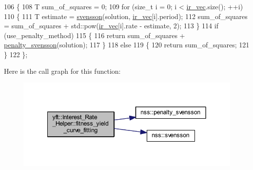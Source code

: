 \begin{DoxyCode}
106         \{
108             T sum\_of\_squares = 0;
109             \textcolor{keywordflow}{for} (\textcolor{keywordtype}{size\_t} i = 0; i < \hyperlink{classyft_1_1_interest___rate___helper_aaa22a1a41fd5eead9ea61136ebc8446c}{ir\_vec}.size(); ++i)
110             \{
111                 T estimate = \hyperlink{namespacenss_a71aad246261afa16f8bb1a4057570d4b}{svensson}(solution, \hyperlink{classyft_1_1_interest___rate___helper_aaa22a1a41fd5eead9ea61136ebc8446c}{ir\_vec}[i].period);
112                 sum\_of\_squares = sum\_of\_squares + std::pow(\hyperlink{classyft_1_1_interest___rate___helper_aaa22a1a41fd5eead9ea61136ebc8446c}{ir\_vec}[i].rate - estimate, 2);
113             \}
114             \textcolor{keywordflow}{if} (use\_penalty\_method)
115             \{
116                 \textcolor{keywordflow}{return} sum\_of\_squares + \hyperlink{namespacenss_a009a0ebbca20f7969d0c2ed5a241aa82}{penalty\_svensson}(solution);
117             \}
118             \textcolor{keywordflow}{else}
119             \{
120                 \textcolor{keywordflow}{return} sum\_of\_squares;
121             \}
122         \};
\end{DoxyCode}
Here is the call graph for this function\+:
\nopagebreak
\begin{figure}[H]
\begin{center}
\leavevmode
\includegraphics[width=342pt]{classyft_1_1_interest___rate___helper_ab8f50bcc6788356b008716a44dc134b8_cgraph}
\end{center}
\end{figure}
\mbox{\label{classyft_1_1_interest___rate___helper_a2bf0217c985329f0f32c9df92b29456c}} 
